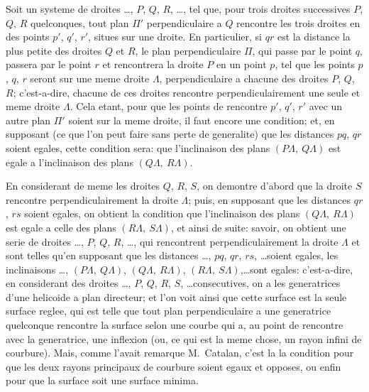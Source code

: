 \documentclass[11pt,a4paper]{book}
\begin{document}
Soit un systeme de droites \ldots, $P$, $Q$, $R$, \ldots, tel que, pour trois droites successives $P$, $Q$, $R$ quelconques, tout plan $\Pi'$ perpendiculaire a $Q$ rencontre les trois droites en des points $p'$, $q'$, $r'$, situes sur une droite. En particulier, si $qr$ est la distance la plus petite des droites $Q$ et $R$, le plan perpendiculaire $\Pi$, qui passe par le point $q$, passera par le point $r$ et rencontrera la droite $P$ en un point $p$, tel que les points $p$, $q$, $r$ seront sur une meme droite $\Lambda$, perpendiculaire a chacune des droites $P$, $Q$, $R$; c'est-a-dire, chacune de ces droites rencontre perpendiculairement une seule et meme droite $\Lambda$. Cela etant, pour que les points de rencontre $p'$, $q'$, $r'$ avec un autre plan $\Pi'$ soient sur la meme droite, il faut encore une condition; et, en supposant (ce que l'on peut faire sans perte de generalite) que les distances $pq$, $qr$ soient egales, cette condition sera: que l'inclinaison des plans $(P\Lambda,\ Q\Lambda)$ est egale a l'inclinaison des plans $(Q\Lambda,\ R\Lambda)$.

En considerant de meme les droites $Q$, $R$, $S$, on demontre d'abord que la droite $S$ rencontre perpendiculairement la droite $\Lambda$; puis, en supposant que les distances $qr$, $rs$ soient egales, on obtient la condition que l'inclinaison des plans $(Q\Lambda,\ R\Lambda)$ est egale a celle des plans $(R\Lambda,\ S\Lambda)$, et ainsi de suite: savoir, on obtient une serie de droites \ldots, $P$, $Q$, $R$, \ldots, qui rencontrent perpendiculairement la droite $\Lambda$ et sont telles qu'en supposant que les distances \ldots, $pq$, $qr$, $rs$, \ldots soient egales, les inclinaisons \ldots, $(P\Lambda,\ Q\Lambda)$, $(Q\Lambda,\ R\Lambda)$, $(R\Lambda,\ S\Lambda)$,\ldots sont egales: c'est-a-dire, en considerant des droites \ldots, $P$, $Q$, $R$, $S$, \ldots consecutives, on a les generatrices d'une helicoide a plan directeur; et l'on voit ainsi que cette surface est la seule surface reglee, qui est telle que tout plan perpendiculaire a une generatrice quelconque rencontre la surface selon une courbe qui a, au point de rencontre avec la generatrice, une inflexion (ou, ce qui est la meme chose, un rayon infini de courbure). Mais, comme l'avait remarque M.~Catalan, c'est la la condition pour que les deux rayons principaux de courbure soient egaux et opposes, ou enfin pour que la surface soit une surface minima.
\end{document}
